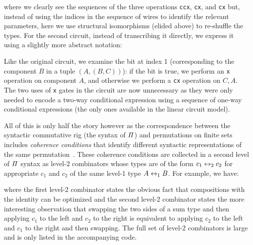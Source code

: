 \medskip

\adder{}

\noindent where we clearly see the sequences of the three operations \verb|ccx|, \verb|cx|, and \verb|cx| but, instead
of using the indices in the sequence of wires to identify the relevant parameters, here we use structural isomorphisms
(elided above) to re-shuffle the types. For the second circuit, instead of transcribing it directly, we express it using
a slightly more abstract notation:

\medskip

\resettwo{}

\noindent Like the original circuit, we examine the bit at index 1 (corresponding to the component $B$ in a tuple
$(A,(B,C))$): if the bit is true, we perform an \verb|x| operation on component $A$, and otherwise we perform a
\verb|cx| operation on $C,A$. The two uses of \verb|x| gates in the circuit are now unnecessary as they were only needed
to encode a two-way conditional expression using a sequence of one-way conditional expressions (the only ones available in
the linear circuit model).

All of this is only half the story however as the correspondence between the syntactic commutative rig (the syntax of $\mathit{\Pi}$)
and permutations on finite sets includes \emph{coherence conditions} that identify different syntactic representations
of the same permutation~\cite{laplaza72,Carette2016}. These coherence conditions are collected in a second level of $\mathit{\Pi}$
syntax as level-2 combinators whose types are of the form $c_1 \leftrightarrow_2 c_2$ for appropriate $c_1$ and $c_2$ of the same
level-1 type $A \leftrightarrow_1 B$. For example, we have:

\medskip

\combtwo{}

\noindent where the first level-2 combinator states the obvious fact that compositions with the identity can be
optimized and the second level-2 combinator states the more interesting observation that swapping the two sides of a sum
type and then applying $c_1$ to the left and $c_2$ to the right is equivalent to applying $c_2$ to the left and $c_1$ to
the right and then swapping. The full set of level-2 combinators is large and is only listed in the accompanying code.



